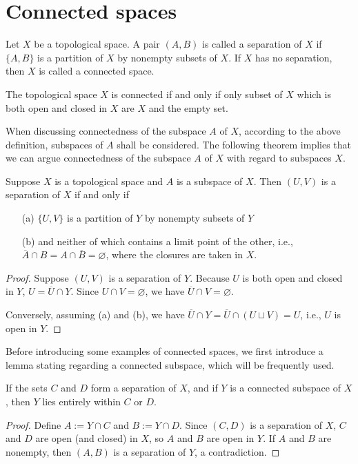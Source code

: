 \section{Connected spaces}

\begin{defi}
    Let $X$ be a topological space.
    A pair $(A, B)$ is called a separation of $X$ if $\{A, B\}$ is a partition of $X$ by nonempty subsets of $X$.
    If $X$ has no separation, then $X$ is called a connected space.
\end{defi}
\begin{rmk}
    The topological space $X$ is connected if and only if only subset of $X$ which is both open and closed in $X$ are $X$ and the empty set.
\end{rmk}

When discussing connectedness of the subspace $A$ of $X$, according to the above definition, subspaces of $A$ shall be considered.
The following theorem implies that we can argue connectedness of the subspace $A$ of $X$ with regard to subspaces $X$.
\begin{thm}
    Suppose $X$ is a topological space and $A$ is a subspace of $X$.
    Then $(U, V)$ is a separation of $X$ if and only if
    \begin{enumerate}
        \item[(a)]
        {
            $\{U, V\}$ is a partition of $Y$ by nonempty subsets of $Y$
        }
        \item[(b)]
        {
            and neither of which contains a limit point of the other, i.e., $\overline{A}\cap B=A\cap\overline{B}=\varnothing$, where the closures are taken in $X$.
        }
    \end{enumerate}
\end{thm}
\begin{proof}
    Suppose $(U, V)$ is a separation of $Y$.
    Because $U$ is both open and closed in $Y$, $U=\overline{U}\cap Y$.
    Since $U\cap V=\varnothing$, we have $\overline{U}\cap V=\varnothing$.

    Conversely, assuming (a) and (b), we have $\overline{U}\cap Y=\overline{U}\cap(U\sqcup V)=U$, i.e., $U$ is open in $Y$.
\end{proof}

Before introducing some examples of connected spaces, we first introduce a lemma stating regarding a connected subspace, which will be frequently used.
\begin{lem}
    If the sets $C$ and $D$ form a separation of $X$, and if $Y$ is a connected subspace of $X$, then $Y$ lies entirely within $C$ or $D$.
\end{lem}
\begin{proof}
    Define $A:=Y\cap C$ and $B:=Y\cap D$.
    Since $(C, D)$ is a separation of $X$, $C$ and $D$ are open (and closed) in $X$, so $A$ and $B$ are open in $Y$.
    If $A$ and $B$ are nonempty, then $(A, B)$ is a separation of $Y$, a contradiction.
\end{proof}

